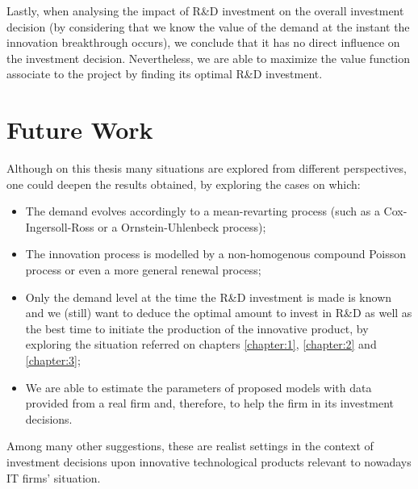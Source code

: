 Lastly, when analysing the impact of R\&D investment on the overall investment decision (by considering that we know the value of the demand at the instant the innovation breakthrough occurs), we conclude that it has no direct influence on the investment decision. Nevertheless, we are able to maximize the value function associate to the project by finding its optimal R\&D investment.

\section{Future Work}
\label{section:future}

Although on this thesis many situations are explored from different perspectives, one could deepen the results obtained, by exploring the cases on which:
\begin{itemize}
	\item The demand evolves accordingly to a mean-revarting process (such as a Cox-Ingersoll-Ross or a Ornstein-Uhlenbeck process);
	
	\item The innovation process is modelled by a non-homogenous compound Poisson process or even a more general renewal process;
	
	\item Only the demand level at the time the R\&D investment is made is known and we (still) want to deduce the optimal amount to invest in R\&D as well as the best time to initiate the production of the innovative product, by exploring the situation referred on chapters \ref{chapter:1}, \ref{chapter:2} and \ref{chapter:3};
	
	\item We are able to estimate the parameters of proposed models with data provided from a real firm and, therefore, to help the firm in its investment decisions.
\end{itemize}

Among many other suggestions, these are realist settings in the context of investment decisions upon innovative technological products relevant to nowadays IT firms' situation.
